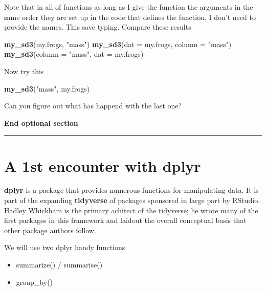 \documentclass[]{book}
\newenvironment{Shaded}{\begin{snugshade}}{\end{snugshade}}
\newcommand{\KeywordTok}[1]{\textcolor[rgb]{0.13,0.29,0.53}{\textbf{#1}}}
\newcommand{\DataTypeTok}[1]{\textcolor[rgb]{0.13,0.29,0.53}{#1}}
\newcommand{\StringTok}[1]{\textcolor[rgb]{0.31,0.60,0.02}{#1}}
\newcommand{\NormalTok}[1]{#1}
\providecommand{\tightlist}{%
  \setlength{\itemsep}{0pt}\setlength{\parskip}{0pt}}
\theoremstyle{definition}
\theoremstyle{definition}
\theoremstyle{definition}
\theoremstyle{remark}
\begin{document}
Note that in all of functions as long as I give the function the
arguments in the same order they are set up in the code that defines the
function, I don't need to provide the names. This save typing. Compare
these results

\begin{Shaded}
\begin{Highlighting}[]
\KeywordTok{my_sd3}\NormalTok{(my.frogs, }\StringTok{"mass"}\NormalTok{)}
\KeywordTok{my_sd3}\NormalTok{(}\DataTypeTok{dat =}\NormalTok{ my.frogs, }\DataTypeTok{column =}  \StringTok{"mass"}\NormalTok{)}
\KeywordTok{my_sd3}\NormalTok{(}\DataTypeTok{column =}  \StringTok{"mass"}\NormalTok{, }\DataTypeTok{dat =}\NormalTok{ my.frogs)}
\end{Highlighting}
\end{Shaded}

Now try this

\begin{Shaded}
\begin{Highlighting}[]
\KeywordTok{my_sd3}\NormalTok{(}\StringTok{"mass"}\NormalTok{, my.frogs)}
\end{Highlighting}
\end{Shaded}

Can you figure out what has happend with the last one?

\textbf{End optional section}

\begin{center}\rule{0.5\linewidth}{\linethickness}\end{center}

\section{A 1st encounter with dplyr}\label{a-1st-encounter-with-dplyr}

\textbf{dplyr} is a package that provides numerous functions for
manipulating data. It is part of the expanding \textbf{tidyverse} of
packages sponsored in large part by RStudio. Hadley Whickham is the
primary achitect of the tidyverse; he wrote many of the first packages
in this framework and laidout the overall conceptual basis that other
package authors follow.

We will use two dplyr handy functions

\begin{itemize}
\tightlist
\item
  summarize() / summarise()
\item
  group\_by()
\end{itemize}
\end{document}
